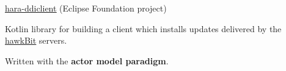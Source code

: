 {}


\begin{cventries}

  \cventry
    {\href{https://github.com/eclipse-hara/hara-ddiclient}{\underline{hara-ddiclient}} (Eclipse Foundation project)} %
    {} %
    {} %
    {} %
    {
    \begin{cvitems}
    		\item Kotlin library for building a client which installs updates delivered by the \href{https://projects.eclipse.org/projects/iot.hawkbit}{\underline{hawkBit}} servers.
    		\item Written with the\textbf{ actor model paradigm}.
    \end{cvitems}
    }
\hfill \break
 
\end{cventries}

